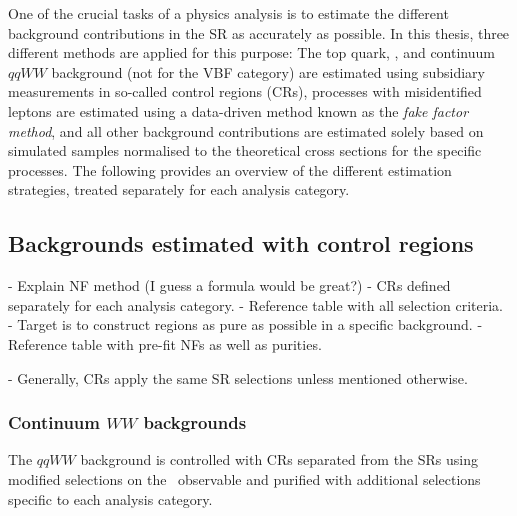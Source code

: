 
One of the crucial tasks of a physics analysis is to estimate the different background contributions in the SR as accurately as possible.
In this thesis, three different methods are applied for this purpose:
The top quark, \Zjets, and continuum $qqWW$ background (not for the VBF category) are estimated using subsidiary measurements in so-called control regions (CRs), processes with misidentified leptons are estimated using a data-driven method known as the \emph{fake factor method}, and all other background contributions are estimated solely based on simulated samples normalised to the theoretical cross sections for the specific processes.
The following provides an overview of the different estimation strategies, treated separately for each analysis category.

\subsection{Backgrounds estimated with control regions}

- Explain NF method (I guess a formula would be great?)
- CRs defined separately for each analysis category.
- Reference table with all selection criteria.
- Target is to construct regions as pure as possible in a specific background.
- Reference table with pre-fit NFs as well as purities.

- Generally, CRs apply the same SR selections unless mentioned otherwise.

\subsubsection{Continuum $WW$ backgrounds}
The $qqWW$ background is controlled with CRs separated from the SRs using modified selections on the \mll\ observable and purified with additional selections specific to each analysis category.

